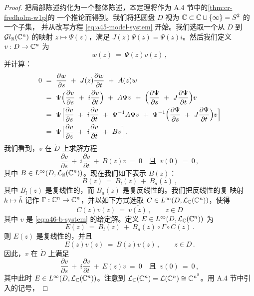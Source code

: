\begin{proof}
把局部陈述约化为一个整体陈述，本定理将作为 A.4 节中的\cref{thm:cr-fredholm-w1p}的%
一个推论而得到。我们将把圆盘 $D$ 视为 $\mathbb{C}\subset\mathbb{C}\cup\{\infty\}=S^{2}$ 的一个子集，%
并从改写方程 \eqref{eq:a45-model-system} 开始。我们选取一个从 $D$ 到%
 $\mathcal{G}l_{\mathbb{R}}(\mathbb{C}^{n})$ 的\trSmooth{}映射 $z\mapsto\Psi(z)$，满足%
 $J(z)\Psi(z)=\Psi(z)i$。然后我们定义 $v:D\to\mathbb{C}^{n}$ 为
\[
w(z)\ =\ \Psi(z)v(z)\,,
\]
并计算：
\begin{align*}
0\ &=\ \frac{\partial w}{\partial s}\ +\ J(z)\frac{\partial w}{\partial t}\ +\ A(z)w\\
&=\ \Psi\Bigl(\frac{\partial v}{\partial s}\ +\ i\frac{\partial v}{\partial t}\Bigr)\ +\ A\Psi v\ +\ \Bigl(\frac{\partial\Psi}{\partial s}\ +\ J\frac{\partial\Psi}{\partial t}\Bigr)v\\
&=\ \Psi\Bigl[\frac{\partial v}{\partial s}\ +\ i\frac{\partial v}{\partial t}\ +\ \Psi^{-1}A\Psi v\ +\ \Psi^{-1}\Bigl(\frac{\partial\Psi}{\partial s}\ +\ J\frac{\partial\Psi}{\partial t}\Bigr)v\Bigr]\\
&=\ \Psi\Bigl[\frac{\partial v}{\partial s}\ +\ i\frac{\partial v}{\partial t}\ +\ Bv\Bigr]\,.
\end{align*}
我们看到，$v$ 在 $\mathring{D}$ 上求解方程
\begin{equation}\label{eq:a46-b-system}
\frac{\partial v}{\partial s}\ +\ i\frac{\partial v}{\partial t}\ +\ B(z)v\ =\ 0
\quad\text{且 }\ v(0)\ =\ 0\,,
\end{equation}
其中 $B\in L^{\infty}(D,\mathcal{L}_{\mathbb{R}}(\mathbb{C}^{n}))$。现在我们如下表示 $B(z)$：
\[
B(z)\ =\ B_{l}(z)\ +\ B_{a}(z)\,,
\]
其中 $B_{l}(z)$ 是复线性的，而 $B_{a}(z)$ 是复反线性的。我们把反线性的复%
\trConjugate{}映射 $h\mapsto\bar{h}$ 记作 $\Gamma:\mathbb{C}^{n}\to\mathbb{C}^{n}$，并以如下方式选取%
 $C\in L^{\infty}(D,\mathcal{L}_{\mathbb{C}}(\mathbb{C}^{n}))$，使得
\[
C(z)v(z)\ =\ \overline{v(z)}\,,\qquad z\in D
\]
其中 $v$ 是 \eqref{eq:a46-b-system} 的给定解。定义%
 $E\in L^{\infty}(D,\mathcal{L}_{\mathbb{C}}(\mathbb{C}^{n}))$ 为
\[
E(z)\ =\ B_{l}(z)\ +\ B_{a}(z)\circ\Gamma\circ C(z)\,.
\]
则 $E(z)$ 是复线性的，并且
\[
E(z)v(z)\ =\ B(z)v(z)\,,\qquad z\in D\,.
\]
因此，$v$ 在 $\mathring{D}$ 上满足
\begin{equation}\label{eq:a47-e-system}
\frac{\partial v}{\partial s}\ +\ i\frac{\partial v}{\partial t}\ +\ E(z)v\ =\ 0
\quad\text{且 }\ v(0)\ =\ 0\,,
\end{equation}
其中此时 $E\in L^{\infty}(D,\mathcal{L}_{\mathbb{C}}(\mathbb{C}^{n}))$。注意到%
 $\mathcal{L}_{\mathbb{C}}(\mathbb{C}^{n})=\mathcal{L}(\mathbb{C}^{n})\cong\mathbb{C}^{n^{2}}$。用 A.4 节中引入的记号，%

\end{proof}
